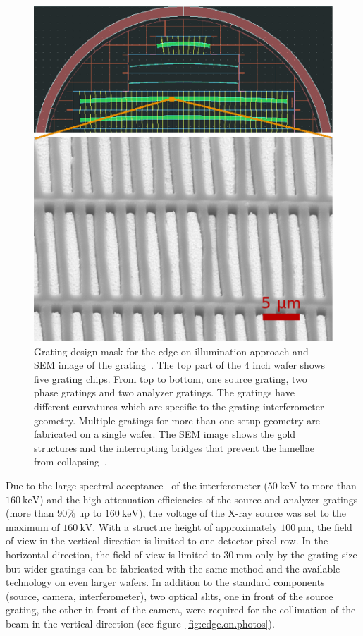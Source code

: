 \begin{figure}[h!]
    \centering
    \includegraphics[width=\textwidth]{gfx/grating_mask.eps}
    \caption[Grating design mask.]{Grating design mask for
        the edge-on illumination approach and \ac{SEM}
        image of the grating~\parencite{Thuering2014b}. The top part of the 4 inch wafer shows
        five grating chips. From top to bottom, one source grating, two
        phase gratings and two analyzer gratings. The
        gratings have different curvatures which are specific to the grating
        interferometer geometry. Multiple gratings for more than one setup
        geometry are fabricated on a single wafer.
        The \ac{SEM} image shows the gold structures and the interrupting bridges
        that prevent the lamellae from collapsing~\parencite{Kenntner2010}.}\label{Fig:grating_mask}
\end{figure}

Due to the large spectral acceptance~\parencite{Weitkamp2005,Thuering2013c} of the
interferometer ($\SI{50}{\kilo\electronvolt}$ to
more than $\SI{160}{\kilo\electronvolt}$) and the high attenuation efficiencies of
the source and analyzer gratings (more than $90\%$ up to
$\SI{160}{\kilo\electronvolt}$), the voltage of the X-ray source was set to
the maximum of $\SI{160}{\kilo\volt}$. With a structure height of
approximately $\SI{100}{\micro\metre}$, the field of view in the vertical
direction is limited to one detector pixel row. In the horizontal direction,
the field of view is limited to $\SI{30}{\milli\metre}$ only by the grating size but wider gratings can be fabricated with the same
method and the available technology on even larger wafers. In addition to the standard components (source,
camera, interferometer), two optical slits, one in front of the source
grating, the other in front of the camera, were required for the collimation
of the beam in the vertical direction (see figure~\ref{fig:edge.on.photos}). 


